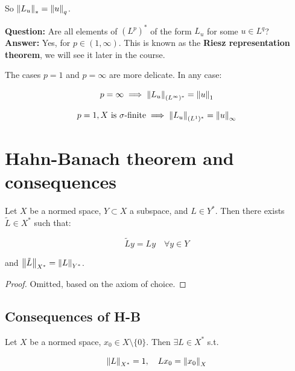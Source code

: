 \begin{fexample}
\begin{enumerate}
        So $\left\|L_u\right\|_* = \left\|u\right\|_q$.
    \end{enumerate}

    \vspace{1em}

    \textbf{Question:} Are all elements of $(L^p)^*$ of the form $L_u$ for 
    some $u \in L^q$?\\

    \textbf{Answer:} Yes, for $p \in (1, \infty)$. This is known as the
    \textbf{Riesz representation theorem}, we will see 
    it later in the course.

\end{fexample}


\begin{fremark}
    The cases $p=1$ and $p = \infty$ are more delicate. In any case:

    $$p=\infty \implies \left\|L_u\right\|_{(L^{\infty})^*} = \left\|u\right\|_1$$
    
    $$p = 1, X \text{ is $\sigma$-finite} \implies \left\|L_u\right\|_{(L^1)^*} = \left\|u\right\|_{\infty}$$
\end{fremark}

\section{Hahn-Banach theorem and consequences}

\begin{ftheorem}
    Let $X$ be a normed space, $Y \subset X$ a subspace, and $L \in Y^*$.
    Then there exists $\tilde{L} \in X^*$ such that:

    $$\tilde{L} y = Ly \quad \forall y \in Y$$

    and $\left\|\tilde{L}\right\|_{X^*} = \left\|L\right\|_{Y^*}$.

\end{ftheorem}

\begin{proof}
    Omitted, based on the axiom of choice.

\end{proof}

\subsection{Consequences of H-B}

\begin{fcorollary}
    Let $X$ be a normed space, $x_0 \in X \setminus \{0\}$. Then 
    $\exists L \in X^*$ s.t.
    
    $$\left\|L\right\|_{X^*} = 1, \quad L x_0 = \left\|x_0\right\|_X$$

\end{fcorollary}

